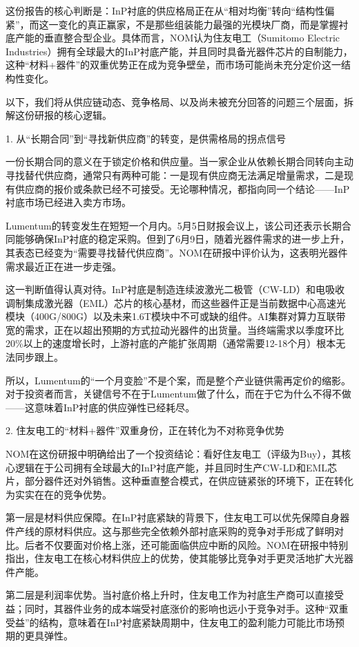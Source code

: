 \documentclass[11pt]{ctexart}
\begin{document}
这份报告的核心判断是：InP衬底的供应格局正在从“相对均衡”转向“结构性偏紧”，而这一变化的真正赢家，不是那些组装能力最强的光模块厂商，而是掌握衬底产能的垂直整合型企业。具体而言，NOM认为住友电工（Sumitomo Electric Industries）拥有全球最大的InP衬底产能，并且同时具备光器件芯片的自制能力，这种“材料+器件”的双重优势正在成为竞争壁垒，而市场可能尚未充分定价这一结构性变化。

以下，我们将从供应链动态、竞争格局、以及尚未被充分回答的问题三个层面，拆解这份研报的核心逻辑。

1. 从“长期合同”到“寻找新供应商”的转变，是供需格局的拐点信号

一份长期合同的意义在于锁定价格和供应量。当一家企业从依赖长期合同转向主动寻找替代供应商，通常只有两种可能：一是现有供应商无法满足增量需求，二是现有供应商的报价或条款已经不可接受。无论哪种情况，都指向同一个结论——InP衬底市场已经进入卖方市场。

Lumentum的转变发生在短短一个月内。5月5日财报会议上，该公司还表示长期合同能够确保InP衬底的稳定采购。但到了6月9日，随着光器件需求的进一步上升，其表态已经变为“需要寻找替代供应商”。NOM在研报中评价认为，这表明光器件需求最近正在进一步走强。

这一判断值得认真对待。InP衬底是制造连续波激光二极管（CW-LD）和电吸收调制集成激光器（EML）芯片的核心基材，而这些器件正是当前数据中心高速光模块（400G/800G）以及未来1.6T模块中不可或缺的组件。AI集群对算力互联带宽的需求，正在以超出预期的方式拉动光器件的出货量。当终端需求以季度环比20\%以上的速度增长时，上游衬底的产能扩张周期（通常需要12-18个月）根本无法同步跟上。

所以，Lumentum的“一个月变脸”不是个案，而是整个产业链供需再定价的缩影。对于投资者而言，关键信号不在于Lumentum做了什么，而在于它为什么不得不做——这意味着InP衬底的供应弹性已经耗尽。

2. 住友电工的“材料+器件”双重身份，正在转化为不对称竞争优势

NOM在这份研报中明确给出了一个投资结论：看好住友电工（评级为Buy），其核心逻辑在于公司拥有全球最大的InP衬底产能，并且同时生产CW-LD和EML芯片，部分器件还对外销售。这种垂直整合模式，在供应链紧张的环境下，正在转化为实实在在的竞争优势。

第一层是材料供应保障。在InP衬底紧缺的背景下，住友电工可以优先保障自身器件产线的原材料供应。这与那些完全依赖外部衬底采购的竞争对手形成了鲜明对比。后者不仅要面对价格上涨，还可能面临供应中断的风险。NOM在研报中特别指出，住友电工在核心材料供应上的优势，使其能够比竞争对手更灵活地扩大光器件产能。

第二层是利润率优势。当衬底价格上升时，住友电工作为衬底生产商可以直接受益；同时，其器件业务的成本端受衬底涨价的影响也远小于竞争对手。这种“双重受益”的结构，意味着在InP衬底紧缺周期中，住友电工的盈利能力可能比市场预期的更具弹性。
\end{document}
